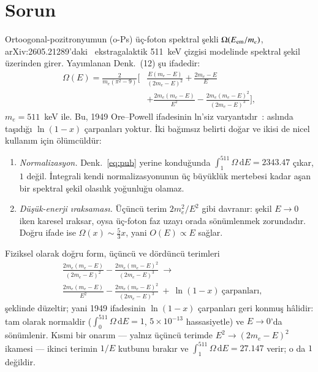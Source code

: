 \documentclass[letter]{aa}
\begin{document}
\section{Sorun}
Ortoogonal-pozitronyumun (o-Ps) üç-foton spektral şekli
$\Omega(E_{\rm em}/m_e)$, arXiv:2605.21289'daki~\citep{sy26} ekstragalaktik
511~keV çizgisi modelinde spektral şekil üzerinden girer. Yayımlanan
Denk.~(12) şu ifadedir:
\begin{equation}
\label{eq:pub}
\begin{split}
\Omega(E) = \frac{2}{m_e(\pi^2-9)}\biggl[&
\frac{E(m_e-E)}{(2m_e-E)^2} + \frac{2m_e-E}{E} \\
&+ \frac{2m_e(m_e-E)}{E^2}
- \frac{2m_e(m_e-E)^2}{(2m_e-E)^3}\biggr],
\end{split}
\end{equation}
$m_e = 511$~keV ile. Bu, 1949 Ore--Powell ifadesinin ln'siz
varyantıdır~\citet{ore49}: aslında taşıdığı $\ln(1-x)$ çarpanları
yoktur. İki bağımsız belirti doğar ve ikisi de nicel kullanım için
ölümcüldür:
\begin{enumerate}
    \item \emph{Normalizasyon.} Denk.~\eqref{eq:pub} yerine konduğunda
    $\int_{1}^{511}\Omega\,\mathrm{d}E = 2343.47$ çıkar, $1$ değil.
    İntegrali kendi normalizasyonunun üç büyüklük mertebesi kadar
    aşan bir spektral şekil olasılık yoğunluğu olamaz.
    \item \emph{Düşük-enerji ıraksaması.} Üçüncü terim $2m_e^2/E^2$
    gibi davranır: şekil $E\to 0$ iken karesel ıraksar, oysa üç-foton
    faz uzayı orada sönümlenmek zorundadır. Doğru ifade ise
    $\Omega(x)\sim\tfrac{5}{3}x$, yani $O(E)\propto E$ sağlar.
\end{enumerate}
Fiziksel olarak doğru form, üçüncü ve dördüncü terimleri
\begin{equation}
\label{eq:corr}
\begin{split}
&\frac{2m_e(m_e-E)}{(2m_e-E)^2}
- \frac{2m_e(m_e-E)^2}{(2m_e-E)^3}
\ \longrightarrow\ \\
&\frac{2m_e(m_e-E)}{E^2}
- \frac{2m_e(m_e-E)^2}{(2m_e-E)^3}
\ +\ \ln(1-x)\ \text{çarpanları},
\end{split}
\end{equation}
şeklinde düzeltir; yani 1949 ifadesinin $\ln(1-x)$ çarpanları geri
konmuş hâlidir: tam olarak normaldir
($\int_0^{511}\Omega\,\mathrm{d}E = 1$, $5\times10^{-13}$ hassasiyetle)
ve $E\to 0$'da sönümlenir. Kısmi bir onarım --- yalnız üçüncü
terimde $E^2 \to (2m_e-E)^2$ ikamesi --- ikinci terimin $1/E$ kutbunu
bırakır ve $\int_{1}^{511}\Omega\,\mathrm{d}E = 27.147$ verir; o da $1$
değildir.
\end{document}
